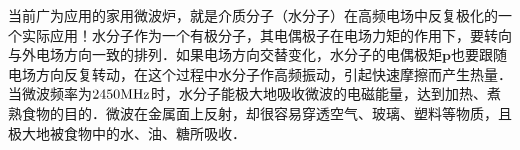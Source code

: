 当前广为应用的家用微波炉，就是介质分子（水分子）在高频电场中反复极化的一个实际应用！水分子作为一个有极分子，其电偶极子在电场力矩的作用下，要转向与外电场方向一致的排列．如果电场方向交替变化，水分子的电偶极矩$\mathbf p$也要跟随电场方向反复转动，在这个过程中水分子作高频振动，引起快速摩擦而产生热量．当微波频率为$2450\rm  MHz$时，水分子能极大地吸收微波的电磁能量，达到加热、煮熟食物的目的．微波在金属面上反射，却很容易穿透空气、玻璃、塑料等物质，且极大地被食物中的水、油、糖所吸收．
